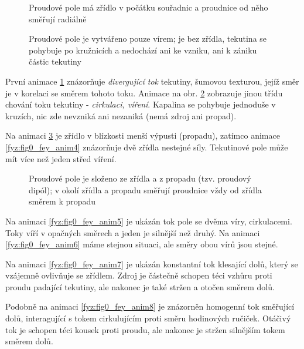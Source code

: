     \begin{figure}[ht!]
      \centering
      \caption{Proudové pole má zřídlo v počátku souřadnic a proudnice od něho směřují radiálně} 
      \label{fyz:fig0_fey_anim1}
    \end{figure}

    \begin{figure}[ht!]
      \centering 
      \caption{Proudové pole je vytvářeno pouze vírem; je bez zřídla, tekutina se pohybuje po 
               kružnicích a nedochází ani ke vzniku, ani k zániku částic tekutiny} 
      \label{fyz:fig0_fey_anim2}
    \end{figure}
    
    První animace \ref{fyz:fig0_fey_anim1} znázorňuje \emph{divergující tok} tekutiny, šumovou 
    texturou, jejíž směr je v korelaci se směrem tohoto toku. Animace na obr. 
    \ref{fyz:fig0_fey_anim2} zobrazuje jinou třídu chování toku tekutiny  - \emph{cirkulaci, 
    víření}. Kapalina se pohybuje jednoduše v kruzích, nic zde nevzniká ani nezaniká (nemá zdroj 
    ani propad).   

    Na animaci \ref{fyz:fig0_fey_anim3} je zřídlo v blízkosti menší výpusti (propadu), zatímco 
    animace \ref{fyz:fig0_fey_anim4} znázorňuje dvě zřídla nestejné síly. Tekutinové pole může mít 
    více než jeden střed víření. 

    \begin{figure}[ht!]
      \centering
      \caption{Proudové pole je složeno ze zřídla a z propadu (tzv. proudový dipól); v okolí 
               zřídla a propadu směřují proudnice vždy od zřídla směrem k propadu}
      \label{fyz:fig0_fey_anim3}
    \end{figure}

    Na animaci \ref{fyz:fig0_fey_anim5} je ukázán tok pole se dvěma víry, cirkulacemi. Toky víří v 
    opačných směrech a jeden je silnější než druhý. Na animaci \ref{fyz:fig0_fey_anim6} máme stejnou 
    situaci, ale směry obou vírů jsou stejné.    
    
    Na animaci \ref{fyz:fig0_fey_anim7} je ukázán konstantní tok klesající dolů, který se vzájemně 
    ovlivňuje se zřídlem. Zdroj je částečně schopen téci vzhůru proti proudu padající tekutiny, ale 
    nakonec je také stržen a otočen směrem dolů.
    
    Podobně na animaci \ref{fyz:fig0_fey_anim8} je znázorněn homogenní tok směřující dolů, 
    interagující s tokem cirkulujícím proti směru hodinových ručiček. Otáčivý tok je schopen téci 
    kousek proti proudu, ale nakonec je stržen silnějším tokem směrem dolů.

